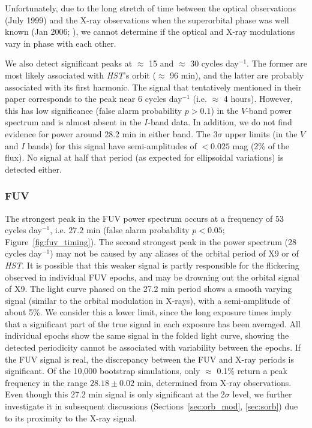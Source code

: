 \documentclass[a4paper,fleqn,usenatbib]{mnras}
\begin{document}
Unfortunately, due to the long stretch of time between the optical observations (July 1999) and the X-ray observations when the superorbital phase was well known (Jan 2006; \citealp{2017MNRAS.467.2199B}), we cannot determine if the optical and X-ray modulations vary in phase with each other.

We also detect significant peaks at $\approx$ 15 and $\approx$ 30 cycles day$^{-1}$. The former are most likely associated with {\it HST}'s orbit ($\approx$ 96 min), and the latter are probably associated with its first harmonic. The signal that \citet{2003ApJ...596.1197E} tentatively mentioned in their paper corresponds to the peak near 6 cycles day$^{-1}$ (i.e. $\approx$ 4 hours). However, this has low significance (false alarm probability $p > 0.1$) in the $V$-band power spectrum and is almost absent in the $I$-band data. In addition, we do not find evidence for power around 28.2 min in either band. The 3$\sigma$ upper limits (in the $V$ and $I$ bands) for this signal have semi-amplitudes of $< 0.025$ mag (2\% of the flux). No signal at half that period (as expected for ellipsoidal variations) is detected either.

\subsubsection{FUV}

The strongest peak in the FUV power spectrum occurs at a frequency of 53 cycles day$^{-1}$, i.e. $27.2$ min (false alarm probability $p < 0.05$; Figure~\ref{fig:fuv_timing}). The second strongest peak in the power spectrum (28 cycles day$^{-1}$) may not be caused by any aliases of the orbital period of X9 or of {\it HST}. It is possible that this weaker signal is partly responsible for the flickering observed in individual FUV epochs, and may be drowning out the orbital signal of X9. The light curve phased on the 27.2 min period shows a smooth varying signal (similar to the orbital modulation in X-rays), with a semi-amplitude of about 5\%. We consider this a lower limit, since the long exposure times imply that a significant part of the true signal in each exposure has been averaged. All individual epochs show the same signal in the folded light curve, showing the detected periodicity cannot be associated with variability between the epochs. If the FUV signal is real, the discrepancy between the FUV and X-ray periods is significant. Of the 10,000 bootstrap simulations, only $\approx$ 0.1\% return a peak frequency in the range $28.18 \pm 0.02$ min, determined from X-ray observations. Even though this 27.2 min signal is only significant at the 2$\sigma$ level,  we further investigate it in subsequent discussions (Sections~\ref{sec:orb_mod}, \ref{sec:sorb}) due to its proximity to the X-ray signal.
\end{document}
